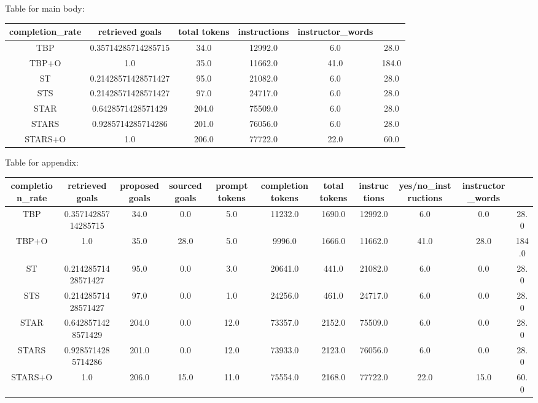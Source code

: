 Table for main body:
\begin{tabular}{c ccccc|}
\hline
completion_rate & retrieved goals & total tokens & instructions & instructor_words \\
\hline
TBP & 0.35714285714285715 & 34.0 & 12992.0 & 6.0 & 28.0 \\
TBP+O & 1.0 & 35.0 & 11662.0 & 41.0 & 184.0 \\
ST & 0.21428571428571427 & 95.0 & 21082.0 & 6.0 & 28.0 \\
STS & 0.21428571428571427 & 97.0 & 24717.0 & 6.0 & 28.0 \\
STAR & 0.6428571428571429 & 204.0 & 75509.0 & 6.0 & 28.0 \\
STARS & 0.9285714285714286 & 201.0 & 76056.0 & 6.0 & 28.0 \\
STARS+O & 1.0 & 206.0 & 77722.0 & 22.0 & 60.0 \\
\hline
\end{tabular}

Table for appendix:
\begin{tabular}{c cccccccccc|}
\hline
completion_rate & retrieved goals & proposed goals & sourced goals & prompt tokens & completion tokens & total tokens & instructions & yes/no_instructions & instructor_words \\
\hline
TBP & 0.35714285714285715 & 34.0 & 0.0 & 5.0 & 11232.0 & 1690.0 & 12992.0 & 6.0 & 0.0 & 28.0 \\
TBP+O & 1.0 & 35.0 & 28.0 & 5.0 & 9996.0 & 1666.0 & 11662.0 & 41.0 & 28.0 & 184.0 \\
ST & 0.21428571428571427 & 95.0 & 0.0 & 3.0 & 20641.0 & 441.0 & 21082.0 & 6.0 & 0.0 & 28.0 \\
STS & 0.21428571428571427 & 97.0 & 0.0 & 1.0 & 24256.0 & 461.0 & 24717.0 & 6.0 & 0.0 & 28.0 \\
STAR & 0.6428571428571429 & 204.0 & 0.0 & 12.0 & 73357.0 & 2152.0 & 75509.0 & 6.0 & 0.0 & 28.0 \\
STARS & 0.9285714285714286 & 201.0 & 0.0 & 12.0 & 73933.0 & 2123.0 & 76056.0 & 6.0 & 0.0 & 28.0 \\
STARS+O & 1.0 & 206.0 & 15.0 & 11.0 & 75554.0 & 2168.0 & 77722.0 & 22.0 & 15.0 & 60.0 \\
\hline
\end{tabular}
